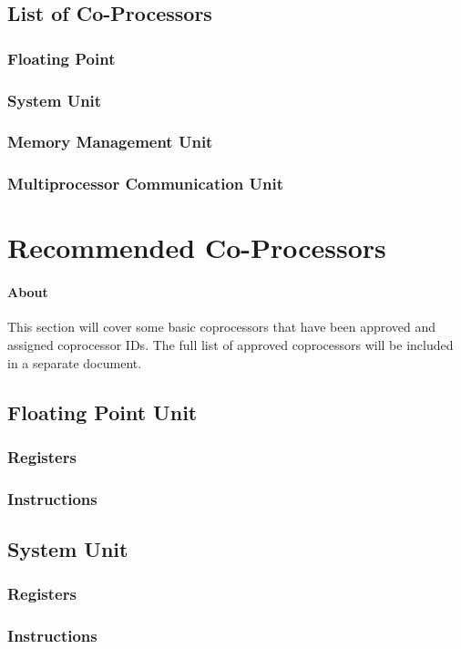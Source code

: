 \documentclass[letterpaper, 11pt]{article}
\begin{document}
\subsection{List of Co-Processors}
\subsubsection{Floating Point}
\subsubsection{System Unit}
\subsubsection{Memory Management Unit}
\subsubsection{Multiprocessor Communication Unit}

\section{Recommended Co-Processors}
\paragraph{About} This section will cover some basic coprocessors that have been approved and assigned coprocessor IDs. The full list of approved coprocessors will be included in a separate document. 
\subsection{Floating Point Unit}
\subsubsection{Registers}
\subsubsection{Instructions}
\subsection{System Unit}
\subsubsection{Registers}
\subsubsection{Instructions}
\end{document}
